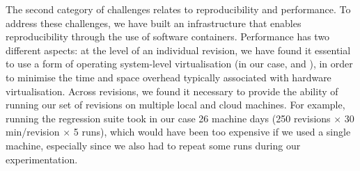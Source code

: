 The second category of challenges relates to reproducibility and performance.
To address these challenges, we have built an infrastructure that enables
reproducibility through the use of software containers. Performance has two
different aspects: at the level of an individual revision, we have found it
essential to use a form of operating system-level virtualisation (in our case,
\lxc and \docker), in order to minimise the time and space overhead typically
associated with hardware virtualisation.  Across revisions, we found it
necessary to provide the ability of running our set of revisions on multiple
local and cloud machines. For example, running the \git regression suite took
in our case 26 machine days (250 revisions $\times$ 30 min/revision $\times$ 5
runs), which would have been too expensive if we used a single machine,
especially since we also had to repeat some runs during our experimentation.
